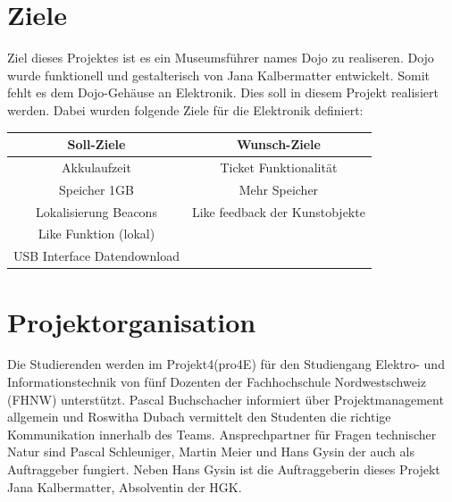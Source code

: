 \documentclass[10pt,a4paper,oneside]{99_fhnwreport}
\begin{document}
\section{Ziele}\label{sec:ziele}
Ziel dieses Projektes ist es ein Museumsführer names Dojo zu realiseren. 
Dojo wurde funktionell und gestalterisch von Jana Kalbermatter entwickelt.
Somit fehlt es dem Dojo-Gehäuse an Elektronik. Dies soll in diesem Projekt realisiert werden.
Dabei wurden folgende Ziele für die Elektronik definiert:

\begin{center}

	\begin{tabular}{|c|c|}
		\hline
		 \textbf{Soll-Ziele} &  \textbf{Wunsch-Ziele} \\ \hline
		Akkulaufzeit & Ticket Funktionalität  \\ \hline
		Speicher 1GB & Mehr Speicher \\ \hline
		Lokalisierung Beacons & Like feedback der Kunstobjekte \\ \hline
		Like Funktion (lokal) &\\ \hline
		USB Interface Datendownload &  \\ \hline
		
	\end{tabular}

\end{center}

\section{Projektorganisation}\label{sec:projektorganisation}
Die Studierenden werden im Projekt4(pro4E) für den Studiengang Elektro- und Informationstechnik von fünf Dozenten der Fachhochschule Nordwestschweiz (FHNW) unterstützt. Pascal Buchschacher informiert über Projektmanagement allgemein und Roswitha Dubach vermittelt den Studenten die richtige Kommunikation innerhalb des Teams. Ansprechpartner für Fragen technischer Natur sind Pascal Schleuniger, Martin Meier und Hans Gysin der auch als Auftraggeber fungiert.
Neben Hans Gysin ist die Auftraggeberin dieses Projekt Jana Kalbermatter, Absolventin der HGK.
\end{document}
